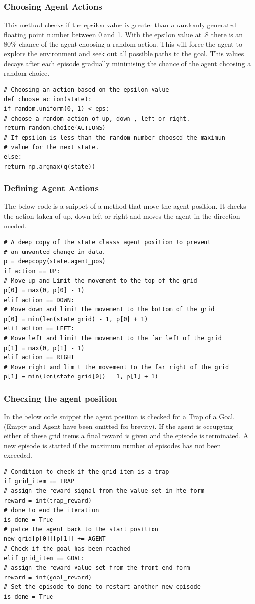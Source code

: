 \subsubsection{Choosing Agent Actions}
This method checks if the epsilon value is greater than a randomly generated
floating point number between 0 and 1.
With the epsilon  value at .8  there is an 80\% chance of the 
agent choosing a random action.
This will force the agent to explore the environment and seek 
out all possible paths to the goal.
This values decays after each episode gradually minimising the
chance of the agent choosing a random choice.
\begin{verbatim}
# Choosing an action based on the epsilon value
def choose_action(state):
if random.uniform(0, 1) < eps:
# choose a random action of up, down , left or right.
return random.choice(ACTIONS)
# If epsilon is less than the random number choosed the maximun
# value for the next state.
else:
return np.argmax(q(state))
\end{verbatim}
\subsubsection{Defining Agent Actions}
The below code is a snippet of a method that move the agent position. It checks the action taken of up, down left or right and moves the agent in the direction needed. 
\begin{verbatim}
# A deep copy of the state classs agent position to prevent
# an unwanted change in data.
p = deepcopy(state.agent_pos)
if action == UP:
# Move up and Limit the movememt to the top of the grid
p[0] = max(0, p[0] - 1)
elif action == DOWN:
# Move down and limit the movement to the bottom of the grid
p[0] = min(len(state.grid) - 1, p[0] + 1)
elif action == LEFT:
# Move left and limit the movement to the far left of the grid
p[1] = max(0, p[1] - 1)
elif action == RIGHT:
# Move right and limit the movement to the far right of the grid
p[1] = min(len(state.grid[0]) - 1, p[1] + 1)
\end{verbatim}
\subsubsection{Checking the agent position}
In the below code snippet the agent position is checked for a Trap of a Goal. (Empty and Agent have been omitted for brevity). If the agent is occupying either of these grid items a final reward is given and the episode is terminated. A new episode is started if the maximum number of episodes has not been exceeded.
\begin{verbatim}
# Condition to check if the grid item is a trap 
if grid_item == TRAP:
# assign the reward signal from the value set in hte form
reward = int(trap_reward)
# done to end the iteration
is_done = True
# palce the agent back to the start position
new_grid[p[0]][p[1]] += AGENT
# Check if the goal has been reached
elif grid_item == GOAL:
# assign the reward value set from the front end form
reward = int(goal_reward)
# Set the episode to done to restart another new episode
is_done = True
\end{verbatim}
